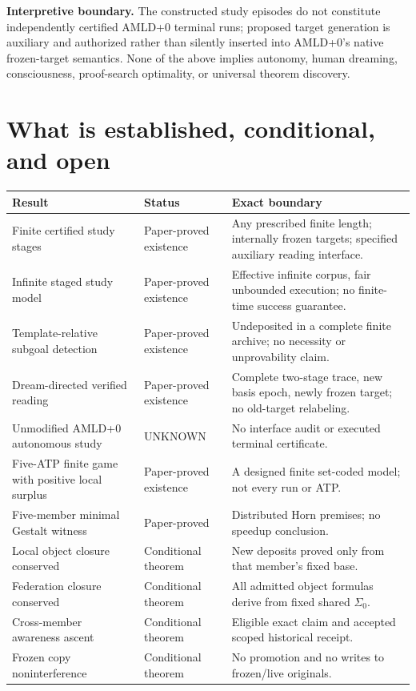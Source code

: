 \documentclass[11pt]{article}
\begin{document}
\noindent\textbf{Interpretive boundary.} The constructed study episodes do not constitute independently certified AMLD+0 terminal runs; proposed target generation is auxiliary and authorized rather than silently inserted into AMLD+0's native frozen-target semantics. None of the above implies autonomy, human dreaming, consciousness, proof-search optimality, or universal theorem discovery.

\section{What is established, conditional, and open}
\begin{longtable}{p{.25\linewidth}p{.18\linewidth}p{.49\linewidth}}\toprule
Result & Status & Exact boundary\\\midrule\endhead
Finite certified study stages & Paper-proved existence & Any prescribed finite length; internally frozen targets; specified auxiliary reading interface.\\
Infinite staged study model & Paper-proved existence & Effective infinite corpus, fair unbounded execution; no finite-time success guarantee.\\
Template-relative subgoal detection & Paper-proved existence & Undeposited in a complete finite archive; no necessity or unprovability claim.\\
Dream-directed verified reading & Paper-proved existence & Complete two-stage trace, new basis epoch, newly frozen target; no old-target relabeling.\\
Unmodified AMLD+0 autonomous study & UNKNOWN & No interface audit or executed terminal certificate.\\
Five-ATP finite game with positive local surplus & Paper-proved existence & A designed finite set-coded model; not every run or ATP.\\
Five-member minimal Gestalt witness & Paper-proved & Distributed Horn premises; no speedup conclusion.\\
Local object closure conserved & Conditional theorem & New deposits proved only from that member's fixed base.\\
Federation closure conserved & Conditional theorem & All admitted object formulas derive from fixed shared $\Sigma_0$.\\
Cross-member awareness ascent & Conditional theorem & Eligible exact claim and accepted scoped historical receipt.\\
Frozen copy noninterference & Conditional theorem & No promotion and no writes to frozen/live originals.\\

\end{longtable}
\end{document}
